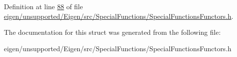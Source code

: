 Definition at line \hyperlink{eigen_2unsupported_2_eigen_2src_2_special_functions_2_special_functions_functors_8h_source_l00088}{88} of file \hyperlink{eigen_2unsupported_2_eigen_2src_2_special_functions_2_special_functions_functors_8h_source}{eigen/unsupported/\+Eigen/src/\+Special\+Functions/\+Special\+Functions\+Functors.\+h}.



The documentation for this struct was generated from the following file\+:\begin{DoxyCompactItemize}
\item 
eigen/unsupported/\+Eigen/src/\+Special\+Functions/\+Special\+Functions\+Functors.\+h\end{DoxyCompactItemize}
